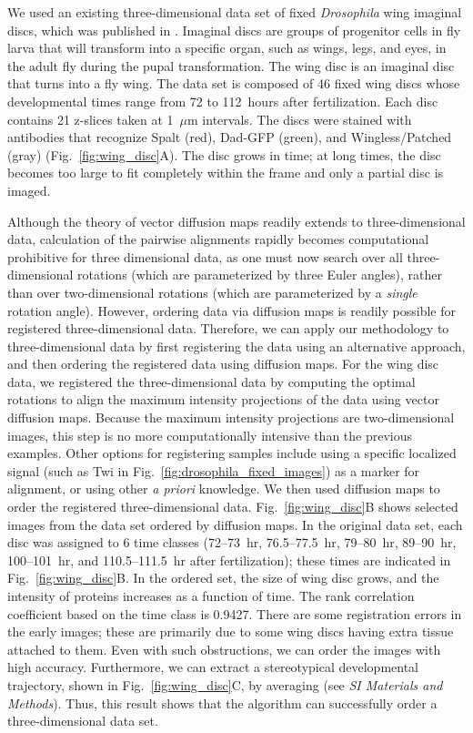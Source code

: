 \documentclass[twocolumn, 10pt]{article}
\newcommand{\SI}[0]{\textit{SI Materials and Methods}}
\newcommand{\fig}[0]{Fig.}
\begin{document}
We used an existing three-dimensional data set of fixed {\em Drosophila} wing imaginal discs, which was published in \citet{hamaratoglu2011dpp}.  
%
Imaginal discs are groups of progenitor cells in fly larva that will transform into a specific organ, such as wings, legs, and eyes, in the adult fly during the pupal transformation. 
%
The wing disc is an imaginal disc that turns into a fly wing. 
%
The data set is composed of 46 fixed wing discs whose developmental times range from 72 to 112~hours after fertilization. 
%
Each disc contains 21 z-slices taken at 1~$\mu$m intervals. 
%
The discs were stained with antibodies that recognize Spalt (red), Dad-GFP (green), and Wingless/Patched (gray) (\fig~\ref{fig:wing_disc}A). 
%
The disc grows in time; at long times, the disc becomes too large to fit completely within the frame and only a partial disc is imaged. 

Although the theory of vector diffusion maps readily extends to three-dimensional data, calculation of the pairwise alignments rapidly becomes computational prohibitive for three dimensional data, as one must now search over all three-dimensional rotations (which are parameterized by three Euler angles), rather than over two-dimensional rotations (which are parameterized by a {\em single} rotation angle). 
%
However, ordering data via diffusion maps is readily possible for registered three-dimensional data. 
%
Therefore, we can apply our methodology to three-dimensional data by first registering the data using an alternative approach, and then ordering the registered data using diffusion maps. 
%
For the wing disc data, we registered the three-dimensional data by computing the optimal rotations to align the maximum intensity projections of the data using vector diffusion maps.
%
Because the maximum intensity projections are two-dimensional images, this step is no more computationally intensive than the previous examples. 
%
Other options for registering samples include using a specific localized signal (such as Twi in \fig~\ref{fig:drosophila_fixed_images}) as a marker for alignment, or using other {\em a priori} knowledge.
%
We then used diffusion maps to order the registered three-dimensional data. 
%
\fig~\ref{fig:wing_disc}B shows selected images from the data set ordered by diffusion maps. 
%
In the original data set, each disc was assigned to 6 time classes (72--73~hr, 76.5--77.5~hr, 79--80~hr, 89--90~hr, 100--101~hr, and 110.5--111.5~hr after fertilization); these times are indicated in \fig~\ref{fig:wing_disc}B. 
%
In the ordered set, the size of wing disc grows, and the intensity of proteins increases as a function of time. 
%
The rank correlation coefficient based on the time class is 0.9427. 
%
There are some registration errors in the early images; these are primarily due to some wing discs having extra tissue attached to them. 
%
Even with such obstructions, we can order the images with high accuracy. 
%
Furthermore, we can extract a stereotypical developmental trajectory, shown in \fig~\ref{fig:wing_disc}C, by averaging (see \SI).
%
Thus, this result shows that the algorithm can successfully order a three-dimensional data set.
\end{document}
